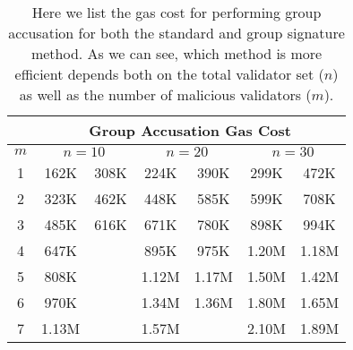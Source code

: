 \begin{table}[t]
\centering
\begin{tabular}{|c||c|c||c|c||c|c|}
\hline
& \multicolumn{6}{|c|}{Group Accusation Gas Cost} \\
\hline
\hline
$m$ & \multicolumn{2}{|c||}{$n = 10$} & \multicolumn{2}{|c||}{$n = 20$} &
    \multicolumn{2}{|c|}{$n = 30$} \\
\hline
    1 &  162K & 308K &  224K &  390K &  299K &  472K \\
    2 &  323K & 462K &  448K &  585K &  599K &  708K \\
    3 &  485K & 616K &  671K &  780K &  898K &  994K \\
    4 &  647K &      &  895K &  975K & 1.20M & 1.18M \\
    5 &  808K &      & 1.12M & 1.17M & 1.50M & 1.42M \\
    6 &  970K &      & 1.34M & 1.36M & 1.80M & 1.65M \\
    7 & 1.13M &      & 1.57M &       & 2.10M & 1.89M \\
\hline
\end{tabular}
\caption[Gas Cost for Invalid Signature]{
    Here we list the gas cost for performing group accusation
    for both the standard and group signature method.
    As we can see, which method is more efficient depends both on
    the total validator set ($n$) as well as the number of malicious
    validators ($m$).
    }
\label{tab:grpsig_accusation_cost}
\end{table}
